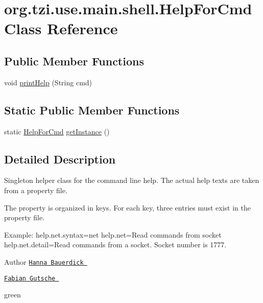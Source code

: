 \hypertarget{classorg_1_1tzi_1_1use_1_1main_1_1shell_1_1_help_for_cmd}{\section{org.\-tzi.\-use.\-main.\-shell.\-Help\-For\-Cmd Class Reference}
\label{classorg_1_1tzi_1_1use_1_1main_1_1shell_1_1_help_for_cmd}
}
\subsection*{Public Member Functions}
\begin{DoxyCompactItemize}
\item 
void \hyperlink{classorg_1_1tzi_1_1use_1_1main_1_1shell_1_1_help_for_cmd_a12f4ec90e0729596c562bea25716c00b}{print\-Help} (String cmd)
\end{DoxyCompactItemize}
\subsection*{Static Public Member Functions}
\begin{DoxyCompactItemize}
\item 
static \hyperlink{classorg_1_1tzi_1_1use_1_1main_1_1shell_1_1_help_for_cmd}{Help\-For\-Cmd} \hyperlink{classorg_1_1tzi_1_1use_1_1main_1_1shell_1_1_help_for_cmd_a0c45285c1a437c501a21ae41932c0fb8}{get\-Instance} ()
\end{DoxyCompactItemize}


\subsection{Detailed Description}
Singleton helper class for the command line help. The actual help texts are taken from a property file.

The property is organized in keys. For each key, three entries must exist in the property file.

Example\-: help.\-net.\-syntax=net help.\-net=Read commands from socket help.\-net.\-detail=Read commands from a socket. Socket number is 1777.

\begin{DoxyAuthor}{Author}
\href{mailto:hanna@tzi.de}{\tt Hanna Bauerdick } 

\href{mailto:gutsche@tzi.de}{\tt Fabian Gutsche } 

green 
\end{DoxyAuthor}


